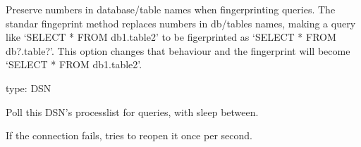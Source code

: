 \documentclass[letterpaper,10pt,english]{sphinxmanual}
\begin{document}

\begin{fulllineitems}
\label{\detokenize{mariadb-query-digest:cmdoption-mariadb-query-digest-preserve-embedded-numbers}}
Preserve numbers in database/table names when fingerprinting queries.
The standar fingeprint method replaces numbers in db/tables names, making
a query like ‘SELECT * FROM db1.table2’ to be figerprinted as ‘SELECT * FROM db?.table?’.
This option changes that behaviour and the fingerprint will become
‘SELECT * FROM db1.table2’.

\end{fulllineitems}


\begin{fulllineitems}
\label{\detokenize{mariadb-query-digest:cmdoption-mariadb-query-digest-processlist}}
type: DSN

Poll this DSN’s processlist for queries, with {\hyperref[\detokenize{mariadb-query-digest:cmdoption-mariadb-query-digest-interval}]{}} sleep between.

If the connection fails,  tries to reopen it once per second.

\end{fulllineitems}
\end{document}
